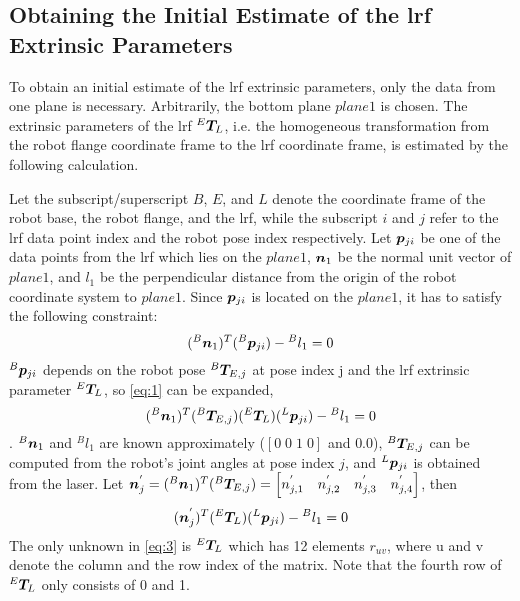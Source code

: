 \subsection{Obtaining the Initial Estimate of the \ac{lrf} Extrinsic Parameters}
\label{sec:first_step}
To obtain an initial estimate of the \ac{lrf} extrinsic parameters, only the data from one plane is necessary. Arbitrarily, the bottom plane $plane 1$ is chosen. The extrinsic parameters of the \ac{lrf} ${^E}\vb*{T}_L$, i.e. the homogeneous transformation from the robot flange coordinate frame to the \ac{lrf} coordinate frame, is estimated by the following calculation. 

Let the subscript/superscript $B$, $E$, and $L$ denote the coordinate frame of the robot base, the robot flange, and the \ac{lrf}, while the subscript $i$ and $j$ refer to the \ac{lrf} data point index and the robot pose index respectively. Let $\vb*{p}_{ji}$ be one of the data points from the \ac{lrf} which lies on the $plane 1$, $\vb*{n}_1$ be the normal unit vector of $plane 1$, and $l_1$ be the perpendicular distance from the origin of the robot coordinate system to $plane 1$.  Since $\vb*{p}_{ji}$ is located on the $plane 1$, it has to satisfy the following constraint:
  \begin{equation}
  \label{eq:1}
  ({^B}\vb*{n}_1) ^T ({^B}\vb*{p}_{ji}) - {^B}l_1 = 0
   \end{equation}
${^B}\vb*{p}_{ji}$ depends on the robot pose ${^B}\vb*{T}_{E,j}$ at pose index j and the \ac{lrf} extrinsic parameter ${^E}\vb*{T}_L$, so \eqref{eq:1}  can be expanded,
  \begin{equation}
  ({^B}\vb*{n}_1) ^T ({^B}\vb*{T}_{E,j}) ({^E}\vb*{T}_L) ({^L}\vb*{p}_{ji}) - {^B}l_1 = 0
  \end{equation}.
${^B}\vb*{n}_1$ and $^{B}l_1$ are known approximately ($[0 \; 0\; 1\;0]$ and $0.0$), ${^B}\vb*{T}_{E,j}$ can be computed from the robot's joint angles at pose index $j$, and ${^L}\vb*{p}_{ji}$ is obtained from the laser. Let $\vb*{n}^{'}_j = ({^B}\vb*{n}_1) ^T ({^B}\vb*{T}_{E,j}) = 
\left[n^{'}_{j,1} \quad n^{'}_{j,2} \quad n^{'}_{j,3}  \quad n^{'}_{j,4} \right]$, then  
  \begin{equation}
  \label{eq:3}
  (\vb*{n}^{'}_j) ^T ({^E}\vb*{T}_L) ({^L}\vb*{p}_{ji}) - {^B}l_1 = 0
  \end{equation}
The only unknown in \eqref{eq:3} is ${^E}\vb*{T}_L$ which has 12 elements $r_{uv}$, where u and v denote the column and the row index of the matrix. Note that the fourth row of ${^E}\vb*{T}_L$ only consists of 0 and 1. 
